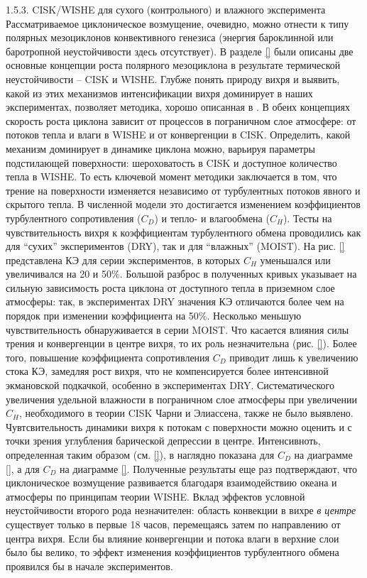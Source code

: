 1.5.3.	CISK/WISHE для сухого (контрольного) и влажного эксперимента
Рассматриваемое циклоническое возмущение, очевидно, можно отнести к типу полярных мезоциклонов конвективного генезиса (энергия бароклинной или баротропной неустойчивости  здесь отсутствует). В разделе \ref{} были описаны две основные концепции роста полярного мезоциклона в результате термической неустойчивости – CISK и WISHE. Глубже понять природу вихря и выявить, какой из этих механизмов интенсификации вихря доминирует в наших экспериментах, позволяет методика, хорошо описанная в \cite{CraigGray1996}. В обеих концепциях скорость роста циклона зависит от процессов в пограничном слое атмосфере: от потоков тепла и влаги в WISHE и от конвергенции в CISK. Определить, какой механизм доминирует в динамике циклона можно, варьируя параметры подстилающей поверхности: шероховатость в CISK и доступное количество тепла в WISHE. То есть ключевой момент методики заключается в том, что трение на поверхности изменяется независимо от турбулентных потоков явного и скрытого тепла. В численной модели это достигается изменением коэффициентов турбулентного сопротивления ($C_D$) и тепло- и влагообмена ($C_H$). 
Тесты на чувствительность вихря к коэффициентам турбулентного обмена проводились как для “сухих” экспериментов (DRY), так и для “влажных” (MOIST). На рис. \ref{} представлена КЭ для серии экспериментов, в которых $C_H$ уменьшался или увеличивался на 20 и 50\%. Большой разброс в полученных кривых указывает на сильную зависимость роста циклона от доступного тепла в приземном слое атмосферы: так, в экспериментах DRY значения КЭ отличаются более чем на порядок при изменении коэффициента на 50\%. Несколько меньшую чувствительность обнаруживается в серии MOIST.
Что касается влияния силы трения и конвергенции в центре вихря, то их роль незначительна (рис. \ref{}). Более того, повышение коэффициента сопротивления $C_D$ приводит лишь к увеличению стока КЭ, замедляя рост вихря, что не компенсируется более интенсивной экмановской подкачкой, особенно в экспериментах DRY. Систематического увеличения удельной влажности в пограничном слое атмосферы при увеличении $C_H$, необходимого в теории CISK Чарни и Элиассена, также не было выявлено.
Чувтсвительность динамики вихря к потокам с поверхности можно оценить и с точки зрения углубления барической депрессии в центре. Интенсивноть, определенная таким образом (см. \ref{}), в наглядно показана для $C_D$  на диаграмме \ref{}, а для $C_D$  на диаграмме \ref{}.
Полученные результаты еще раз подтверждают, что циклоническое возмущение развивается благодаря взаимодействию океана и атмосферы по принципам теории WISHE. Вклад эффектов условной неустойчивости второго рода незначителен: область конвекции в вихре \emph{в центре} существует только в первые 18 часов, перемещаясь затем по направлению от центра вихря. Если бы влияние конвергенции и потока влаги в верхние слои было бы велико, то эффект изменения коэффициентов турбулентного обмена проявился бы в начале экспериментов.
